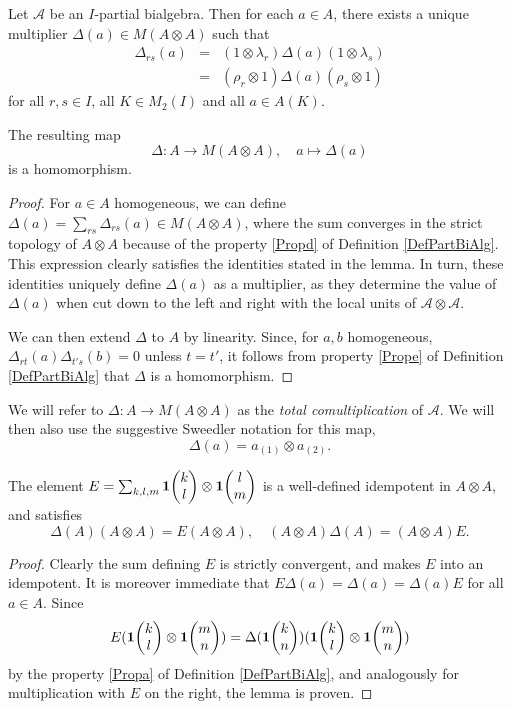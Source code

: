 \begin{Lem} Let $\mathscr{A}$ be an $I$-partial bialgebra. Then for each $a\in A$, there exists a unique multiplier $\Delta(a) \in M(A\otimes A)$ such that \begin{eqnarray}\label{EqDel} \Delta_{rs}(a) &=& (1\otimes \lambda_r)\Delta(a)(1\otimes \lambda_s) \\ &=& (\rho_r\otimes 1)\Delta(a)(\rho_s\otimes 1)\end{eqnarray}  for all $r,s\in I$, all $K\in M_2(I)$ and all $a\in A(K)$. 

The resulting map \[\Delta:A\rightarrow M(A\otimes A),\quad a\mapsto \Delta(a)\] is a homomorphism.
\end{Lem}
\begin{proof} For $a\in A$ homogeneous, we can define $\Delta(a) = \sum_{rs} \Delta_{rs}(a) \in M(A\otimes A)$, where the sum converges in the strict topology of $A\otimes A$ because of the property \ref{Propd} of Definition \ref{DefPartBiAlg}. This expression clearly satisfies the identities stated in the lemma. In turn, these identities uniquely define $\Delta(a)$ as a multiplier, as they determine the value of $\Delta(a)$ when cut down to the left and right with the local units of $\mathscr{A}\otimes \mathscr{A}$.

We can then extend $\Delta$ to $A$ by linearity. Since, for $a,b$ homogeneous, $\Delta_{rt}(a)\Delta_{t's}(b)=0$ unless $t=t'$, it follows from property \ref{Prope} of Definition \ref{DefPartBiAlg} that $\Delta$ is a homomorphism. 
\end{proof}

We will refer to $\Delta: A\rightarrow M(A\otimes A)$ as the \emph{total comultiplication} of $\mathscr{A}$. We will then also use the suggestive Sweedler notation for this map, \[\Delta(a) = a_{(1)}\otimes a_{(2)}.\]

\begin{Lem} The element $E = \sum_{k,l,m} \mathbf{1}\!\begin{pmatrix} k \\ l\end{pmatrix}\otimes \mathbf{1}\!\begin{pmatrix} l \\ m\end{pmatrix}$ is a well-defined idempotent in $A\otimes A$, and satisfies \[\Delta(A)(A\otimes A)=E(A\otimes A),\quad (A\otimes A)\Delta(A)= (A\otimes A)E.\]
\end{Lem} 
\begin{proof} Clearly the sum defining $E$ is strictly convergent, and makes $E$ into an idempotent. It is moreover immediate that $E\Delta(a)=\Delta(a) = \Delta(a)E$ for all $a\in A$. Since \[E(\mathbf{1}\!\begin{pmatrix} k \\ l\end{pmatrix}\otimes \mathbf{1}\!\begin{pmatrix} m \\ n\end{pmatrix}) = \Delta(\mathbf{1}\!\begin{pmatrix} k \\ n\end{pmatrix})(\mathbf{1}\!\begin{pmatrix} k \\ l\end{pmatrix}\otimes \mathbf{1}\!\begin{pmatrix} m \\ n\end{pmatrix}) \] by the property \ref{Propa} of Definition \ref{DefPartBiAlg}, and analogously for multiplication with $E$ on the right, the lemma is proven. 
\end{proof} 

